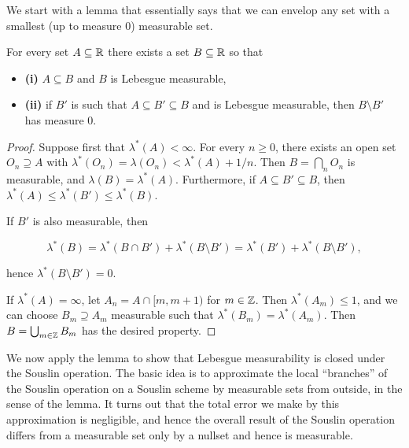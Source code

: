 We start with a lemma that essentially says that we can envelop any
set with a smallest (up to measure 0) measurable set.

\begin{lemma}\label{lem-approx-measurable}For every set $A \subseteq \mathbb{R}$ there exists a set $B \subseteq \mathbb{R}$ so that

\begin{itemize}
\item \textbf{(i)} $A \subseteq B$ and $B$  is  Lebesgue measurable,
\item \textbf{(ii)} if $B'$ is such that $A \subseteq B' \subseteq B$  and is Lebesgue measurable, then $B\setminus B'$ has measure 0.
\end{itemize}

\end{lemma}\begin{proof}Suppose first that $\lambda^*(A) < \infty$. For every $n \geq 0$, there exists an open set $O_n \supseteq A$ with $\lambda^*(O_n) = \lambda(O_n) < \lambda^*(A) + 1/n$. Then $B = \bigcap_n O_n$ is measurable, and $\lambda(B) = \lambda^*(A)$. Furthermore, if $A \subseteq B' \subseteq B$, then $\lambda^*(A) \leq  \lambda^*(B') \leq \lambda^*(B)$.

If $B'$ is also measurable, then

\begin{equation}
\lambda^*(B) = \lambda^*(B \cap B') + \lambda^*(B \setminus B') = \lambda^*(B') + \lambda^*(B \setminus B'),
\end{equation}

hence $\lambda^*(B \setminus B') = 0$.

If $\lambda^*(A) = \infty$, let $A_n = A \cap [m,m+1)$ for $m \in \mathbb{Z}$. Then $\lambda^*(A_m) \leq 1$, and we can choose $B_m \supseteq A_m$ measurable such that $\lambda^*(B_m) = \lambda^*(A_m)$. Then $B = \bigcup_{m \in \mathbb{Z}} B_m$ has the desired property.

\end{proof}We now apply the lemma to show that Lebesgue measurability is closed
under the Souslin operation. The basic idea is to approximate the local
``branches'' of the Souslin operation on a Souslin scheme by measurable
sets from outside, in the sense of the lemma.
It turns out that the total error we make by this approximation is
negligible, and hence the overall result of the Souslin operation
differs from a measurable set only by a nullset and hence is
measurable.

